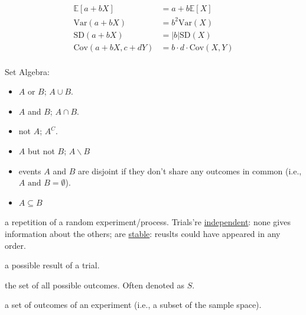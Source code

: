 \documentclass[10pt,landscape]{article}
\newcommand{\Blue}[1]{\noindent{\textbf{\textcolor{Blue}{#1 -}}}}
\newcommand{\Green}[1]{\noindent{\textbf{\textcolor{PineGreen}{#1 -}}}}
\begin{document}
\raggedright
\footnotesize
\begin{multicols}{4}


\setlength{\premulticols}{1pt}
\setlength{\postmulticols}{1pt}
\setlength{\multicolsep}{1pt}
\setlength{\columnsep}{2pt}

\Green{Handy Transformations}
\begin{displaymath}
    \boxed{
        \begin{aligned}
            \mathbb{E}\left[a + b X\right] &= a + b\mathbb{E}\left[X\right] \\
            \text{Var}(a + b X) &= b^2 \text{Var}(X) \\
            \text{SD}(a + b X) &= |b| \text{SD}(X) \\
            \text{Cov}\left(a + b X, c + d Y\right) &= b \cdot d \cdot \text{Cov}(X, Y) \\
        \end{aligned}
    }
\end{displaymath}

Set Algebra:
\begin{itemize}
    \item \Blue{Union} $A$ or $B$; $A \cup B$.
    \item \Blue{Intersection} $A$ and $B$; $A \cap B$.
    \item \Blue{Complement} not $A$; $A^C$.
    \item \Blue{Difference} $A$ but not $B$; $A \backslash B$
    \item \Blue{Disjoint Events aka. mutually exclusive} events $A$ and $B$ are disjoint if they don't share any
        outcomes in common (i.e., $A \text{ and } B = \emptyset$).
    \item \Blue{Subset} $A \subseteq B$
\end{itemize}

\Blue{Trial} a repetition of a random experiment/process. Trials're \underline{independent}: none gives information about the
others; are \underline{stable}: reuslts could have appeared in any order.

\Blue{Outcome} a possible result of a trial.

\Blue{Sample space} the set of all possible outcomes. Often denoted as $S$.

\Blue{Event} a set of outcomes of an experiment (i.e., a subset of the sample space).


\end{multicols}
\end{document}
